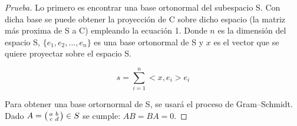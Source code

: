 \documentclass[12pt]{article}
\newenvironment{xmat}
  {\left(\begin{smallmatrix}}
  {\end{smallmatrix}\right)}
\begin{document}
\begin{proof}[Prueba]

Lo primero es encontrar una base ortonormal del subespacio S. Con dicha base se puede obtener la proyección de C sobre dicho espacio (la matriz más proxima de S a C) empleando la ecuación 1. Donde $n$ es la dimensión del espacio S, $\{e_{1}, e_{2},..., e_{n}\}$ es una base ortonormal de S y $x$ es el vector que se quiere proyectar sobre el espacio S.

\begin{equation} \label{eq1}
s = \sum_{i=1}^{n} <x, e_{i}>e_{i}
\end{equation}

Para obtener una base ortornormal de S, se usará el proceso de Gram–Schmidt. Dado $A=\begin{xmat}a & b\\c & d\end{xmat} \in S$ se cumple: $AB=BA=0$.


\end{proof}
\end{document}
